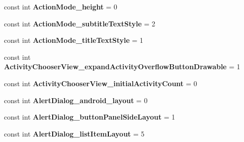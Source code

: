 \begin{DoxyCompactItemize}
\mbox{\label{class_pinned_app_1_1_droid_1_1_resource_1_1_styleable_a8a678e0044bf87a07536cf40d34ffb04}} 
const int {\bfseries Action\+Mode\+\_\+height} = 0
\item 
\mbox{\label{class_pinned_app_1_1_droid_1_1_resource_1_1_styleable_a4d5e766561052e03e755691b29be7c44}} 
const int {\bfseries Action\+Mode\+\_\+subtitle\+Text\+Style} = 2
\item 
\mbox{\label{class_pinned_app_1_1_droid_1_1_resource_1_1_styleable_a8191f749e5d2d8c97f3168a70e57452c}} 
const int {\bfseries Action\+Mode\+\_\+title\+Text\+Style} = 1
\item 
\mbox{\label{class_pinned_app_1_1_droid_1_1_resource_1_1_styleable_ae99d373d9d8b0be187a5e8cb105266ab}} 
const int {\bfseries Activity\+Chooser\+View\+\_\+expand\+Activity\+Overflow\+Button\+Drawable} = 1
\item 
\mbox{\label{class_pinned_app_1_1_droid_1_1_resource_1_1_styleable_a25ddc6876b147e6a1becb3aa7606e163}} 
const int {\bfseries Activity\+Chooser\+View\+\_\+initial\+Activity\+Count} = 0
\item 
\mbox{\label{class_pinned_app_1_1_droid_1_1_resource_1_1_styleable_a16421f16ccdad3670cc0001ca87123c7}} 
const int {\bfseries Alert\+Dialog\+\_\+android\+\_\+layout} = 0
\item 
\mbox{\label{class_pinned_app_1_1_droid_1_1_resource_1_1_styleable_a5ad0185cbfea3a055f7a30f2b15598fe}} 
const int {\bfseries Alert\+Dialog\+\_\+button\+Panel\+Side\+Layout} = 1
\item 
\mbox{\label{class_pinned_app_1_1_droid_1_1_resource_1_1_styleable_a8813adfccd2ed3ebd0c803254544f324}} 
const int {\bfseries Alert\+Dialog\+\_\+list\+Item\+Layout} = 5
\item 
\mbox{\label{class_pinned_app_1_1_droid_1_1_resource_1_1_styleable_a264e98a3f777cbf15da529bacad2fffd}} 

\end{DoxyCompactItemize}
